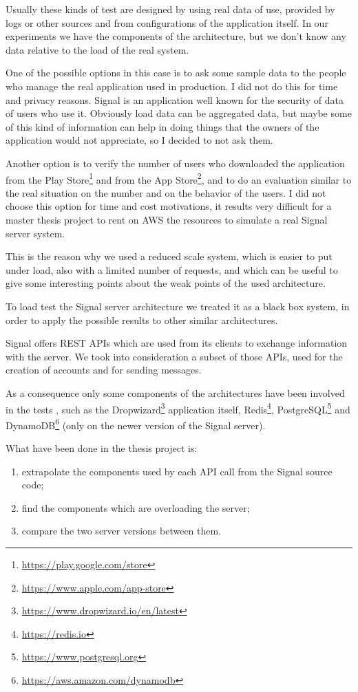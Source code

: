 Usually these kinds of test are designed by using real data of use, provided by logs or other sources and from configurations of the application itself.
In our experiments we have the components of the architecture, but we don't know any data relative to the load of the real system.

One of the possible options in this case is to ask some sample data to the people who manage the real application used in production.
I did not do this for time and privacy reasons. Signal is an application well known for the security of data of users who use it.
Obviously load data can be aggregated data, but maybe some of this kind of information can help in doing things that the owners of the application would not appreciate, so I decided to not ask them.

Another option is to verify the number of users who downloaded the application from the Play Store\footnote{\url{https://play.google.com/store}} and from the App Store\footnote{\url{https://www.apple.com/app-store}}, and to do an evaluation similar to the real situation on the number and on the behavior of the users.
I did not choose this option for time and cost motivations, it results very difficult for a master thesis project to rent on AWS the resources to simulate a real Signal server system.

This is the reason why we used a reduced scale system, which is easier to put under load, also with a limited number of requests, and which can be useful to give some interesting points about the weak points of the used architecture.

To load test the Signal server architecture we treated it as a black box system, in order to apply the possible results to other similar architectures.

Signal offers REST APIs which are used from its clients to exchange information with the server. We took into consideration a subset of those APIs, used for the creation of accounts and for sending messages.

As a consequence only some components of the architectures have been involved in the tests \cite{read_2021,cocorada_2018}, such as the Dropwizard\footnote{\url{https://www.dropwizard.io/en/latest}} application itself, Redis\footnote{\url{https://redis.io}}, PostgreSQL\footnote{\url{https://www.postgresql.org}} and DynamoDB\footnote{\url{https://aws.amazon.com/dynamodb}} (only on the newer version of the Signal server).

What have been done in the thesis project is:
\begin{enumerate}
    \item extrapolate the components used by each API call from the Signal source code;
    \item find the components which are overloading the server;
    \item compare the two server versions between them.
\end{enumerate}

